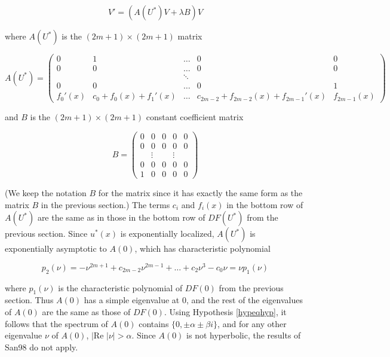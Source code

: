 \documentclass[thesis.tex]{subfiles}
\begin{document}
\begin{equation}\label{PDEeig2}
V' = ( A(U^*)V + \lambda B)V 
\end{equation}

where $A(U^*)$ is the $(2m+1) \times (2m+1)$ matrix

\begin{equation}\label{DefA}
A(U^*) = \begin{pmatrix}
0 & 1 & \dots & 0 & 0 \\
0 & 0 & \dots & 0 & 0 \\
& & \ddots  \\
0 & 0 & \dots & 0 & 1 \\
f_0'(x) & c_0 + f_0(x) + f_1'(x) & \dots & c_{2m-2} + f_{2m-2}(x) + f_{2m-1}' (x) & f_{2m-1}(x)
\end{pmatrix}
\end{equation}

and $B$ is the $(2m +1) \times (2m+1)$ constant coefficient matrix

\begin{equation}\label{DefB}
B = \begin{pmatrix}0 & 0 & 0 & 0 & 0 \\0 & 0 & 0 & 0 & 0 \\  & 
\vdots & & \vdots & \\0 & 0 & 0 & 0 & 0 \\1 & 0 & 0 & 0 & 0 \end{pmatrix} 
\end{equation}

(We keep the notation $B$ for the matrix since it has exactly the same form as the matrix $B$ in the previous section.) The terms $c_i$ and $f_i(x)$ in the bottom row of $A(U^*)$ are the same as in those in the bottom row of $DF(U^*)$ from the previous section. Since $u^*(x)$ is exponentially localized, $A(U^*)$ is exponentially asymptotic to $A(0)$, which has characteristic polynomial

\begin{equation}\label{charpolyA0}
p_2(\nu) = -\nu^{2m+1} + c_{2m-2} \nu^{2m-1} + \dots + c_2 \nu^3 - c_0 \nu = \nu p_1(\nu)
\end{equation}

where $p_1(\nu)$ is the characteristic polynomial of $DF(0)$ from the previous section. Thus $A(0)$ has a simple eigenvalue at 0, and the rest of the eigenvalues of $A(0)$ are the same as those of $DF(0)$. Using Hypothesis \ref{hypeqhyp}, it follows that the spectrum of $A(0)$ contains $\{ 0, \pm \alpha \pm \beta i\}$, and for any other eigenvalue $\nu$ of $A(0)$, $|\text{Re }|\nu| > \alpha$. Since $A(0)$ is not hyperbolic, the results of San98 do not apply.\\
\end{document}
